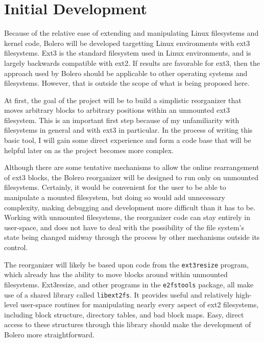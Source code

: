 \documentclass[10pt,twocolumn]{article}
\begin{document}
\section{Initial Development}

Because of the relative ease of extending and manipulating Linux filesystems and
kernel code, Bolero will be developed targetting Linux environments with ext3
filesystems. Ext3 is the standard filesystem used in Linux
environments, and is largely backwards compatible with ext2\cite{ext2journal}.
If results are favorable for ext3, then the approach used by Bolero should be
applicable to other operating systems and filesystems. However, that is outside
the scope of what is being proposed here.

At first, the goal of the project will be to build a simplistic reorganizer
that moves arbitrary blocks to arbitrary positions within an unmounted ext3
filesystem. This is an important first step because of my unfamiliarity with
filesystems in general and with ext3 in particular. In the process of writing this basic
tool, I will gain some direct experience and form a code base that will be 
helpful later on as the project becomes more complex.

Although there are some tentative mechanisms to allow the online rearrangement
of ext3 blocks\cite{ext3online}, the Bolero reorganizer will be
designed to run only on unmounted filesystems. Certainly, it would be
convenient for the user to be able to manipulate a mounted filesystem, but doing so
would add unnecessary complexity, making debugging and
development more difficult than it has to be. Working with unmounted filesystems,
the reorganizer code can stay entirely in user-space, and does not have
to deal with the possibility of the file system's state being changed
midway through the process by other mechanisms outside its control.

The reorganizer will likely be based upon code from the \texttt{ext3resize} program,
which already has the ability to move blocks around within unmounted filesystems. Ext3resize, and other
programs in the \texttt{e2fstools} package, all make use of a shared library called
\texttt{libext2fs}\cite{libext2fs}. It provides useful and relatively high-level user-space routines for
manipulating nearly every aspect of ext2 filesystems, including block
structure, directory tables, and bad block maps. Easy, direct access to these structures
through this library should make the development of Bolero more straightforward.
\end{document}
